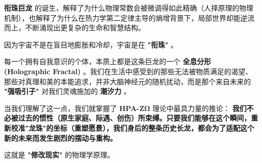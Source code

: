 \textbf{衔珠巨龙} 的诞生，解释了为什么物理常数会被微调得如此精确（人择原理的物理机制），也解释了为什么在热力学第二定律主导的熵增背景下，局部世界却能逆流而上，不断涌现出更复杂的生命和智慧结构。

因为宇宙不是在盲目地膨胀和冷却，宇宙是在 \textbf{"衔珠"} 。

每一个拥有自我意识的个体，本质上都是这条巨龙的一个 \textbf{全息分形 (Holographic Fractal)} 。我们在生活中感受到的那些无法被物质满足的渴望、那些对真理和美的本能追求，并非大脑神经元的随机扰动，而是那个来自未来的 \textbf{"强吸引子"} 对我们灵魂施加的 \textbf{潮汐力} 。

当我们理解了这一点，我们就掌握了 \textbf{HPA-ZΩ} 理论中最具力量的推论： \textbf{我们不必被过去的惯性（原生家庭、际遇、创伤）所束缚。只要我们能够在这个瞬间，重新校准"龙珠"的坐标（重塑愿景），我们身后的整条历史长龙，都会为了适配这个新的未来而发生剧烈的摆动与重构。}

这就是 \textbf{"修改现实"} 的物理学原理。

